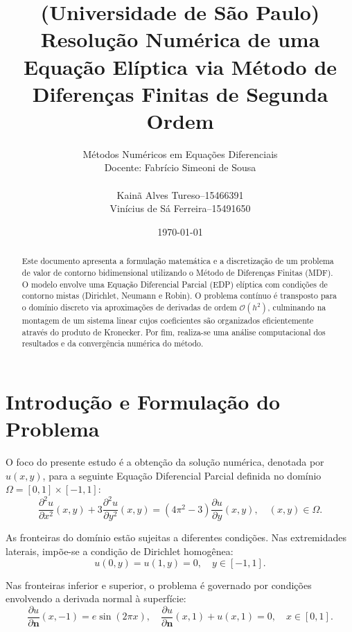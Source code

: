\documentclass[12pt, a4paper]{article}
\title{(Universidade de São Paulo)\\
Resolução Numérica de uma Equação Elíptica via Método de Diferenças Finitas de Segunda Ordem}
\author{Métodos Numéricos em Equações Diferenciais\\
Docente: Fabrício Simeoni de Sousa\\[.2cm]
\begin{tabular}{r@{\ }c@{\ }l}
    Kainã Alves Tureso      &-- &15466391\\
    Vinícius de Sá Ferreira &-- &15491650
\end{tabular}}
\date{\today}
\begin{document}
    \maketitle

    \tableofcontents

    \vfill
    \begin{abstract}
        Este documento apresenta a formulação matemática e a discretização de um problema de valor de contorno bidimensional utilizando o Método de Diferenças Finitas (MDF). O modelo envolve uma Equação Diferencial Parcial (EDP) elíptica com condições de contorno mistas (Dirichlet, Neumann e Robin). O problema contínuo é transposto para o domínio discreto via aproximações de derivadas de ordem $\mathcal{O}(h^2)$, culminando na montagem de um sistema linear cujos coeficientes são organizados eficientemente através do produto de Kronecker. Por fim, realiza-se uma análise computacional dos resultados e da convergência numérica do método.
    \end{abstract}

    \section{Introdução e Formulação do Problema}

    O foco do presente estudo é a obtenção da solução numérica, denotada por $u(x,y)$, para a seguinte Equação Diferencial Parcial definida no domínio $\Omega = [0,1] \times [-1,1]$:
    \begin{equation}
        \frac{\partial^2 u}{\partial x^2}(x,y) + 3\frac{\partial^2 u}{\partial y^2}(x,y) = (4\pi^2-3)\frac{\partial u}{\partial y}(x,y), \quad (x,y) \in \Omega. \label{eq}
    \end{equation}

    As fronteiras do domínio estão sujeitas a diferentes condições. Nas extremidades laterais, impõe-se a condição de Dirichlet homogênea:
    \begin{equation}
        u(0,y) = u(1,y) = 0, \quad y \in [-1,1]. \label{dirichlet}
    \end{equation}

    Nas fronteiras inferior e superior, o problema é governado por condições envolvendo a derivada normal à superfície:
    \begin{equation}
        \frac{\partial u}{\partial \mathbf{n}}(x,-1) = e \sin(2\pi x),\quad \frac{\partial u }{\partial \mathbf{n}}(x,1) + u(x,1) = 0, \quad x \in [0,1]. \label{neumann}
    \end{equation}
\end{document}
